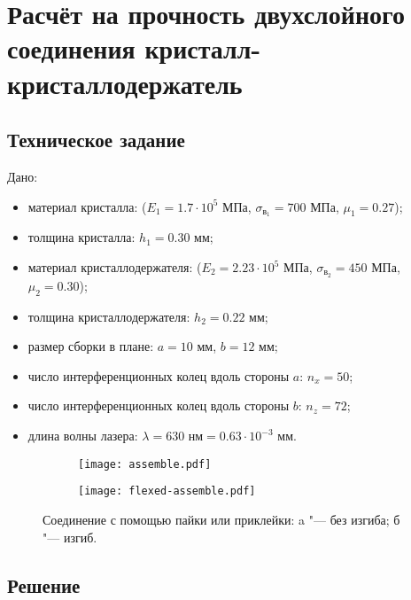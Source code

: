 \chapter{Расчёт на прочность двухслойного соединения кристалл-кристаллодержатель}

\section{Техническое задание}

Дано: 
\begin{itemize}
    \item материал кристалла:
         ($E_1 = 1.7 \cdot 10^5 \text{ МПа}$, $\sigma_{в_1} = 700 \text{ МПа}$, $\mu_1 = 0.27$);
    \item толщина кристалла:
        $h_1 = 0.30 \text{ мм}$;
    \item материал кристаллодержателя:
         ($E_2 = 2.23 \cdot 10^5 \text{ МПа}$, $\sigma_{в_2} = 450 \text{ МПа}$, $\mu_2 = 0.30$);
    \item толщина кристаллодержателя:
        $h_2 = 0.22 \text{ мм}$;
    \item размер сборки в плане:
        $a = 10 \text{ мм}$, $b = 12 \text{ мм}$;
    \item число интерференционных колец вдоль стороны $a$:
        $n_x = 50$;
    \item число интерференционных колец вдоль стороны $b$:
        $n_z = 72$;
    \item длина волны лазера:
        $\lambda = 630 \text{ нм} = 0.63 \cdot 10^{-3} \text{ мм}$.
\end{itemize}

\begin{figure}[!ht]
    \centering
    \begin{subfigure}[b]{0.45\textwidth}
        \centering
        \texttt{[image: assemble.pdf]}
        \caption{}
        \label{fig:assemble}
    \end{subfigure}
    \begin{subfigure}[b]{0.45\textwidth}
        \centering
        \texttt{[image: flexed-assemble.pdf]}
        \caption{}
        \label{fig:flexed-assemble}
    \end{subfigure}
    \caption{Соединение с помощью пайки или приклейки:
    a "--- без изгиба;
    б "--- изгиб.
    }
    \label{fig:assembles}
\end{figure}

\section{Решение}

